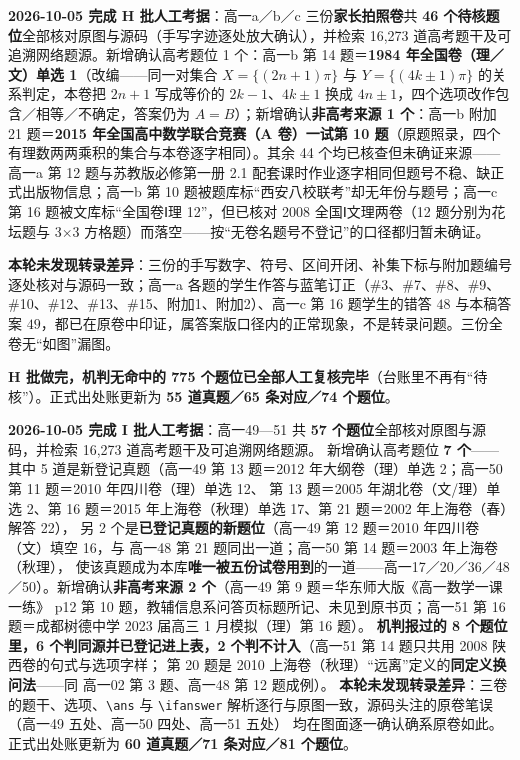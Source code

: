 \documentclass[a4paper,11pt]{article}
\begin{document}
\textbf{2026-10-05 完成 H 批人工考据}：高一a／b／c 三份\textbf{家长拍照卷}共 \textbf{46 个待核题位}全部核对原图与源码（手写字迹逐处放大确认），并检索 16,273 道高考题干及可追溯网络题源。新增确认高考题位 1 个：高一b 第 14 题＝\textbf{1984 年全国卷（理／文）单选 1}（改编------同一对集合 \(X=\{(2n+1)\pi\}\) 与 \(Y=\{(4k\pm1)\pi\}\) 的关系判定，本卷把 \(2n+1\) 写成等价的 \(2k-1\)、\(4k\pm1\) 换成 \(4n\pm1\)，四个选项改作包含／相等／不确定，答案仍为 \(A=B\)）；新增确认\textbf{非高考来源 1 个}：高一b 附加 21 题＝\textbf{2015 年全国高中数学联合竞赛（A 卷）一试第 10 题}（原题照录，四个有理数两两乘积的集合与本卷逐字相同）。其余 44 个均已核查但未确证来源------高一a 第 12 题与苏教版必修第一册 2.1 配套课时作业逐字相同但题号不稳、缺正式出版物信息；高一b 第 10 题被题库标``西安八校联考''却无年份与题号；高一c 第 16 题被文库标``全国卷Ⅰ理 12''，但已核对 2008 全国Ⅰ文理两卷（12 题分别为花坛题与 3$\times$3 方格题）而落空------按``无卷名题号不登记''的口径都归暂未确证。

\textbf{本轮未发现转录差异}：三份的手写数字、符号、区间开闭、补集下标与附加题编号逐处核对与源码一致；高一a 各题的学生作答与蓝笔订正（\#3、\#7、\#8、\#9、\#10、\#12、\#13、\#15、附加1、附加2）、高一c 第 16 题学生的错答 \(48\) 与本稿答案 \(49\)，都已在原卷中印证，属答案版口径内的正常现象，不是转录问题。三份全卷无``如图''漏图。

\textbf{H 批做完，机判无命中的 775 个题位已全部人工复核完毕}（台账里不再有``待核''）。正式出处账更新为 \textbf{55 道真题／65 条对应／74 个题位}。

\textbf{2026-10-05 完成 I 批人工考据}：高一49---51 共 \textbf{57 个题位}全部核对原图与源码，并检索 16,273 道高考题干及可追溯网络题源。
新增确认高考题位 \textbf{7 个}------其中 5 道是新登记真题（高一49 第 13 题＝2012 年大纲卷（理）单选 2；高一50 第 11 题＝2010 年四川卷（理）单选 12、
第 13 题＝2005 年湖北卷（文/理）单选 2、第 16 题＝2015 年上海卷（秋理）单选 17、第 21 题＝2002 年上海卷（春）解答 22），
另 2 个是\textbf{已登记真题的新题位}（高一49 第 12 题＝2010 年四川卷（文）填空 16，与 高一48 第 21 题同出一道；高一50 第 14 题＝2003 年上海卷（秋理），
使该真题成为本库\textbf{唯一被五份试卷用到}的一道------高一17／20／36／48／50）。新增确认\textbf{非高考来源 2 个}（高一49 第 9 题＝华东师大版《高一数学一课一练》
p12 第 10 题，教辅信息系问答页标题所记、未见到原书页；高一51 第 16 题＝成都树德中学 2023 届高三 1 月模拟（理）第 16 题）。
\textbf{机判报过的 8 个题位里，6 个判同源并已登记进上表，2 个判不计入}（高一51 第 14 题只共用 2008 陕西卷的句式与选项字样；
第 20 题是 2010 上海卷（秋理）``远离''定义的\textbf{同定义换问法}------同 高一02 第 3 题、高一48 第 12 题成例）。
\textbf{本轮未发现转录差异}：三卷的题干、选项、\texttt{\textbackslash{}ans} 与 \texttt{\textbackslash{}ifanswer} 解析逐行与原图一致，源码头注的原卷笔误（高一49 五处、高一50 四处、高一51 五处）
均在图面逐一确认确系原卷如此。正式出处账更新为 \textbf{60 道真题／71 条对应／81 个题位}。
\end{document}
